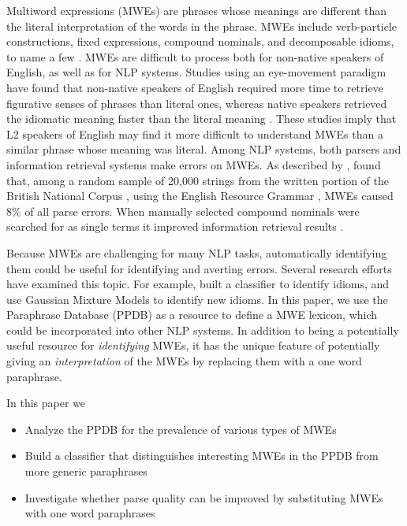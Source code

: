 \documentclass[11pt]{article}
\begin{document}
Multiword expressions (MWEs) are phrases whose meanings are different than the literal interpretation of the words in the phrase. MWEs include verb-particle constructions, fixed expressions, compound nominals, and decomposable idioms, to name a few \cite{Sag2002}.  MWEs are difficult to process both for non-native speakers of English, as well as for NLP systems. Studies using an eye-movement paradigm have found that non-native speakers of English required more time to retrieve figurative senses of phrases than literal ones, whereas native speakers retrieved the idiomatic meaning faster than the literal meaning \cite{siyanova-chanturia-martinez:2014}. These studies imply that L2 speakers of English may find it more difficult to understand MWEs than a similar phrase whose meaning was literal.  Among NLP systems, both parsers and information retrieval systems make errors on MWEs. As described by ,  found that, among a random sample of 20,000 strings from the written portion of the British National Corpus \cite{Burnard2000}, using the English Resource Grammar \cite{Copestake+Flickinger2000}, MWEs caused 8\% of all parse errors. When manually selected compound nominals were searched for as single terms it improved information retrieval results \cite{Acosta2011}.

Because MWEs are challenging for many NLP tasks, automatically identifying them could be useful for identifying and averting errors.  Several research efforts have examined this topic.  For example,  built a classifier to identify idioms, and  use Gaussian Mixture Models to identify new idioms.  In this paper, we use the Paraphrase Database (PPDB) as a resource to define a MWE lexicon, which could be incorporated into other NLP systems.  In addition to being a potentially useful resource for {\it identifying} MWEs, it has the unique feature of potentially giving an {\it interpretation} of the MWEs by replacing them with a one word paraphrase.  

In this paper we
\begin{itemize}
\item Analyze the PPDB for the prevalence of various types of MWEs
\item Build a classifier that distinguishes interesting MWEs in the PPDB from more generic paraphrases
\item Investigate whether parse quality can be improved by substituting MWEs with one word paraphrases
\end{itemize}
\end{document}
